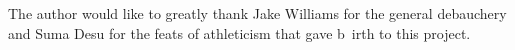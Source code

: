 The author would like to greatly thank Jake Williams for the general debauchery and Suma Desu for the feats of athleticism that gave b\
irth to this project.
